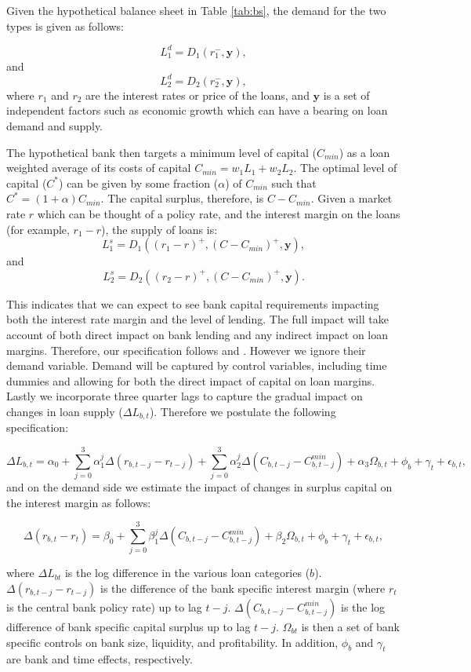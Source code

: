 \documentclass[
]{article}
\begin{document}
Given the hypothetical balance sheet in Table \ref{tab:bs}, the demand for the two types is given as follows:

\[L_1^d = D_1(r_1^-, \boldsymbol{y}), \] and
\[L_2^d = D_2(r_2^-, \boldsymbol{y}), \]
where \(r_1\) and \(r_2\) are the interest rates or price of the loans, and \(\boldsymbol{y}\) is a set of independent factors such as economic growth which can have a bearing on loan demand and supply.

The hypothetical bank then targets a minimum level of capital (\(C_{min}\)) as a loan weighted average of its costs of capital \(C_{min} = w_1L_1 + w_2L_2\). The optimal level of capital (\(C^*\)) can be given by some fraction (\(\alpha\)) of \(C_{min}\) such that \(C^* = (1+\alpha)C_{min}\). The capital surplus, therefore, is \(C - C_{min}\). Given a market rate \(r\) which can be thought of a policy rate, and the interest margin on the loans (for example, \(r_{1} -r\)), the supply of loans is:
\[L_1^s = D_1((r_1 - r)^+,  (C - C_{min})^+, \boldsymbol{y}),\] and
\[L_2^s = D_2((r_2 - r)^+,  (C - C_{min})^+, \boldsymbol{y}).\]

This indicates that we can expect to see bank capital requirements impacting both the interest rate margin and the level of lending. The full impact will take account of both direct impact on bank lending and any indirect impact on loan margins. Therefore, our specification follows \citet{fang2020bank} and \citet{aiyar2016does}. However we ignore their demand variable. Demand will be captured by control variables, including time dummies and allowing for both the direct impact of capital on loan margins. Lastly we incorporate three quarter lags to capture the gradual impact on changes in loan supply (\(\Delta L_{b,t}\)). Therefore we postulate the following specification:

\[\Delta L_{b,t} = \alpha_0 + \sum_{j=0}^{3} \alpha_1^j \Delta (r_{b,t-j}-r_{t-j})+ \sum_{j=0}^{3}\alpha_2^j \Delta (C_{b,t-j}-C_{b,t-j}^{min}) +\alpha_3 \Omega_{b,t} + \phi_b + \gamma_t + \epsilon_{b,t},\]
and on the demand side we estimate the impact of changes in surplus capital on the interest margin as follows:

\[\Delta (r_{b,t}-r_t) = \beta_0 + \sum_{j=0}^{3}\beta_1^j \Delta (C_{b,t-j}-C_{b,t-j}^{min}) +\beta_2 \Omega_{b,t}+ \phi_b + \gamma_t + \epsilon_{b,t},\]

where \(\Delta L_{bt}\) is the log difference in the various loan categories (\(b\)). \(\Delta (r_{b,t-j}-r_{t-j})\) is the difference of the bank specific interest margin (where \(r_t\) is the central bank policy rate) up to lag \(t-j\). \(\Delta(C_{b,t-j}-C_{b,t-j}^{min})\) is the log difference of bank specific capital surplus up to lag \(t-j\). \(\Omega_{bt}\) is then a set of bank specific controls on bank size, liquidity, and profitability. In addition, \(\phi_b\) and \(\gamma_t\) are bank and time effects, respectively.
\end{document}
